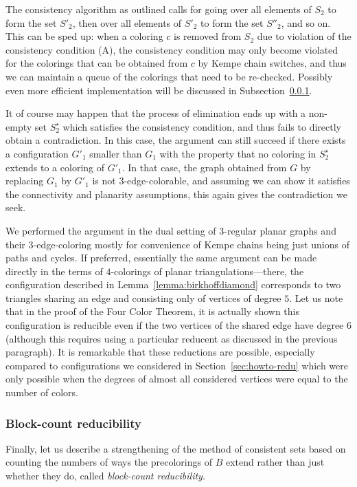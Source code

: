 \documentclass[12pt,twoside,openright,a4paper]{book}
\begin{document}
The consistency algorithm as outlined calls for going over all elements of $S_2$ to form the set $S'_2$, then
over all elements of $S'_2$ to form the set $S''_2$, and so on.  This can be sped up: when a coloring $c$
is removed from $S_2$ due to violation of the consistency condition (A), the consistency condition may only become violated
for the colorings that can be obtained from $c$ by Kempe chain switches, and thus we can maintain a queue of
the colorings that need to be re-checked.  Possibly even more efficient implementation will be discussed in Subsection~\ref{ssec:bcr}.

It of course may happen that the process of elimination ends up with a non-empty set $S^\star_2$ which satisfies
the consistency condition, and thus fails to directly obtain a contradiction.  In this case, the argument can still
succeed if there exists a configuration $G'_1$ smaller than $G_1$ with the property that no coloring in $S^\star_2$
extends to a coloring of $G'_1$.  In that case, the graph obtained from $G$ by replacing $G_1$ by $G'_1$ is not
$3$-edge-colorable, and assuming we can show it satisfies the connectivity and planarity assumptions, this again
gives the contradiction we seek.

We performed the argument in the dual setting of $3$-regular planar graphs and their $3$-edge-coloring mostly for convenience
of Kempe chains being just unions of paths and cycles. If preferred, essentially the same argument can be made directly
in the terms of $4$-colorings of planar triangulations---there, the configuration described in Lemma~\ref{lemma:birkhoffdiamond} corresponds to two triangles
sharing an edge and consisting only of vertices of degree $5$.  Let us note that in the proof of the Four Color Theorem, it is actually shown
this configuration is reducible even if the two vertices of the shared edge have degree $6$ (although this requires using a particular reducent
as discussed in the previous paragraph).  It is remarkable that these reductions are possible, especially compared to configurations
we considered in Section~\ref{sec:howto-redu} which were only possible when the degrees of almost all considered vertices were equal
to the number of colors.

\subsubsection{Block-count reducibility}\label{ssec:bcr}

Finally, let us describe a strengthening of the method of consistent sets based on counting the numbers of ways the precolorings
of $B$ extend rather than just whether they do, called \emph{block-count reducibility}.
\end{document}
